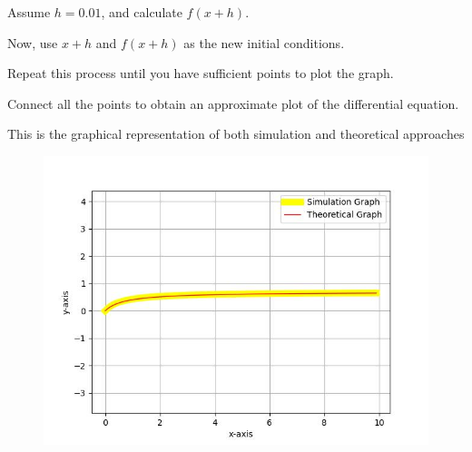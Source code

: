 \documentclass[journal]{IEEEtran}
\begin{document}
Assume $h = 0.01$, and calculate $f(x+h)$. 

Now, use $x+h$ and $f(x+h)$ as the new initial conditions. 

Repeat this process until you have sufficient points to plot the graph. 

Connect all the points to obtain an approximate plot of the differential equation. 

This is the graphical representation of both simulation and theoretical approaches 

\begin{figure}[h!]
   \centering
   \includegraphics[width=\columnwidth]{fig/combined_fig.jpg}
\end{figure}
\end{document}
